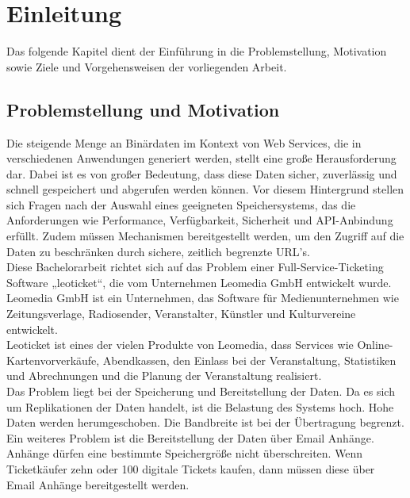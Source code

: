 \chapter{Einleitung}

Das folgende Kapitel dient der Einführung in die Problemstellung, Motivation sowie Ziele und Vorgehensweisen der vorliegenden Arbeit.

\section{Problemstellung und Motivation}

Die steigende Menge an Binärdaten im Kontext von Web Services, die in verschiedenen Anwendungen generiert werden, stellt eine große Herausforderung dar. Dabei ist es von großer Bedeutung, dass diese Daten sicher, zuverlässig und schnell gespeichert und abgerufen werden können. Vor diesem Hintergrund stellen sich Fragen nach der Auswahl eines geeigneten Speichersystems, das die Anforderungen wie Performance, Verfügbarkeit, Sicherheit und API-Anbindung erfüllt.  Zudem müssen Mechanismen bereitgestellt werden, um den Zugriff auf die Daten zu beschränken durch sichere, zeitlich begrenzte URL’s.\\

Diese Bachelorarbeit richtet sich auf das Problem einer Full-Service-Ticketing Software „leoticket“, die vom Unternehmen Leomedia GmbH entwickelt wurde. 
Leomedia GmbH ist ein Unternehmen, das Software für Medienunternehmen wie Zeitungsverlage, Radiosender, Veranstalter, Künstler und Kulturvereine entwickelt. \textcite{leomedia-web}\\
Leoticket ist eines der vielen Produkte von Leomedia, dass Services wie Online-Kartenvorverkäufe, Abendkassen, den Einlass bei der Veranstaltung, Statistiken und Abrechnungen und die Planung der Veranstaltung realisiert.\textcite{leomedia-web}\\ 


Das Problem liegt bei der Speicherung und Bereitstellung der Daten. Da es sich um Replikationen der Daten handelt, ist die Belastung des Systems hoch. Hohe Daten werden herumgeschoben. Die Bandbreite ist bei der Übertragung begrenzt. Ein weiteres Problem ist die Bereitstellung der Daten über Email Anhänge. Anhänge dürfen eine bestimmte Speichergröße nicht überschreiten. Wenn Ticketkäufer zehn oder 100 digitale Tickets kaufen, dann müssen diese über Email Anhänge bereitgestellt werden.\\


